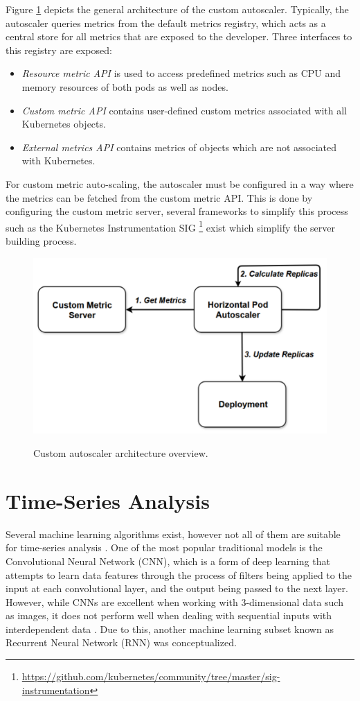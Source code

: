 Figure \ref{fig:custom-autoscale-overview} depicts the general architecture of the custom autoscaler. Typically, the autoscaler queries metrics from the default metrics registry, which acts as a central store for all metrics that are exposed to the developer. Three interfaces to this registry are exposed:
\begin{itemize}
    \item \textit{Resource metric API} is used to access predefined metrics such as CPU and memory resources of both pods as well as nodes.
    \item \textit{Custom metric API} contains user-defined custom metrics associated with all Kubernetes objects.
    \item \textit{External metrics API} contains metrics of objects which are not associated with Kubernetes.
\end{itemize}
For custom metric auto-scaling, the autoscaler must be configured in a way where the metrics can be fetched from the custom metric API. This is done by configuring the custom metric server, several frameworks to simplify this process such as the Kubernetes Instrumentation SIG \footnote{\url{https://github.com/kubernetes/community/tree/master/sig-instrumentation}} exist which simplify the server building process.

\begin{figure}[htb]
    \centering
    \caption{Custom autoscaler architecture overview.}
    \includegraphics[width=.7\linewidth]{Figures/Custom-Metrics-Autoscaling.pdf}
    \label{fig:custom-autoscale-overview}
\end{figure}

\section{Time-Series Analysis}
\label{sec:ch2-time-series}

Several machine learning algorithms exist, however not all of them are suitable for time-series analysis \cite{mahmoud2021survey}. One of the most popular traditional models is the Convolutional Neural Network (CNN), which is a form of deep learning that attempts to learn data features through the process of filters being applied to the input at each convolutional layer, and the output being passed to the next layer. However, while CNNs are excellent when working with 3-dimensional data such as images, it does not perform well when dealing with sequential inputs with interdependent data \cite{zhao2017convolutional}. Due to this, another machine learning subset known as Recurrent Neural Network (RNN) was conceptualized. \par

